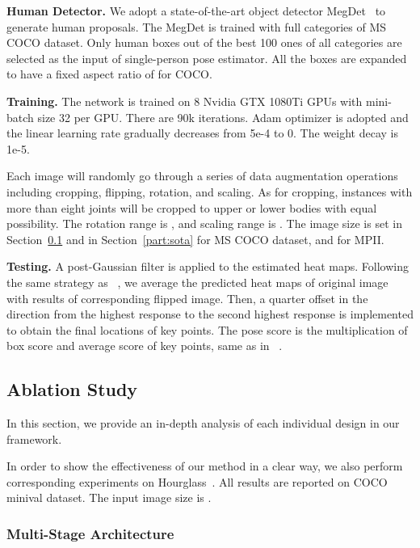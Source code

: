 \documentclass[10pt,twocolumn,letterpaper]{article}
\begin{document}
{\bfseries Human Detector.}
We adopt a state-of-the-art object detector MegDet~\cite{peng2018megdet} to generate human proposals. The MegDet is trained with full categories of MS COCO dataset. Only human boxes out of the best 100 ones of all categories are selected as the input of single-person pose estimator. All the boxes are expanded to have a fixed aspect ratio of  for COCO.

{\bfseries Training.}
The network is trained on 8 Nvidia GTX 1080Ti GPUs with mini-batch size 32 per GPU. There are 90k iterations. Adam optimizer is adopted and the linear learning rate gradually decreases from 5e-4 to 0. The weight decay is 1e-5. 

Each image will randomly go through a series of data augmentation operations including cropping, flipping, rotation, and scaling. As for cropping, instances with more than eight joints will be cropped to upper or lower bodies with equal possibility. The rotation range is , and scaling range is . The image size is set  in Section~\ref{part:ablation} and  in Section~\ref{part:sota} for MS COCO dataset, and  for MPII. 

{\bfseries Testing.}
A post-Gaussian filter is applied to the estimated heat maps. Following the same strategy as ~\cite{newell2016stacked}, we average the predicted heat maps of original image with results of corresponding flipped image. Then, a quarter offset in the direction from the highest response to the second highest response is implemented to obtain the final locations of key points. The pose score is the multiplication of box score and average score of key points, same as in ~\cite{chen2018cascaded}.

\subsection{Ablation Study}
\label{part:ablation}
In this section, we provide an in-depth analysis of each individual design in our framework.

In order to show the effectiveness of our method in a clear way, we also perform corresponding experiments on Hourglass~\cite{newell2016stacked}. All results are reported on COCO minival dataset. The input image size is .

\subsubsection{Multi-Stage Architecture}
\label{part:multi-stage}
\end{document}
